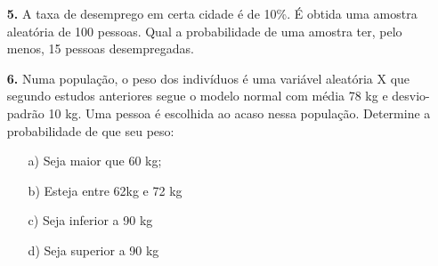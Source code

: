 \begin{itemize}
	\item[\textbf{5.}] A taxa de desemprego em certa cidade é de 10\%. É obtida uma amostra aleatória de 100 pessoas. Qual a probabilidade de uma amostra ter, pelo menos, 15 pessoas desempregadas.\\
	
	\item[\textbf{6.}] Numa população, o peso dos indivíduos é uma variável aleatória X que segundo estudos anteriores segue o modelo normal com média 78 kg e desvio-padrão 10 kg. Uma pessoa é escolhida ao acaso nessa população. Determine a probabilidade de que seu peso:
		\begin{itemize}
		\item[a)] Seja maior que 60 kg;
	        \resposta{}
		\item[b)] Esteja entre 62kg e 72 kg
		    \resposta{}
		\item[c)] Seja inferior a 90 kg
		    \resposta{}
		\item[d)] Seja superior a 90 kg
		    \resposta{}
	\end{itemize}
	
\end{itemize}